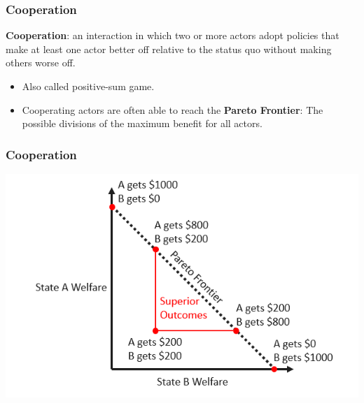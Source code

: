\documentclass[handout]{beamer}
\begin{document}
\begin{frame} 
	\frametitle{\LARGE{Cooperation}}
	\textbf{Cooperation}: an interaction in which two or more actors adopt policies that make at least one actor better off relative to the status quo without making others worse off.
	\begin{itemize}
		\item Also called positive-sum game.
		\item Cooperating actors are often able to reach the \textbf{Pareto Frontier}: The possible divisions of the maximum benefit for all actors.
	\end{itemize}
\end{frame}

\begin{frame} 
	\frametitle{\LARGE{Cooperation}}
	\centering	\includegraphics[width=\textwidth,height=0.8\textheight,keepaspectratio]{cooperation.png}
\end{frame}
\end{document}
